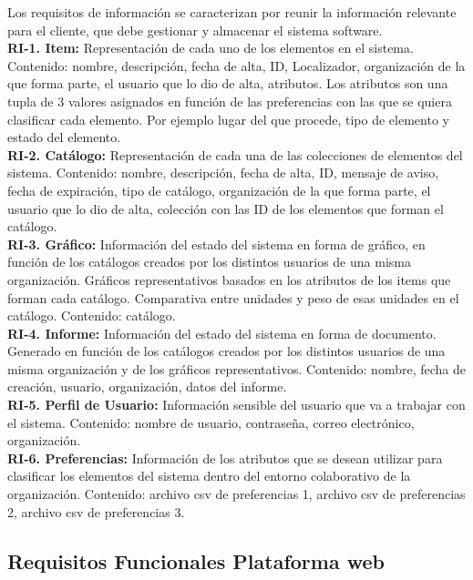 \documentclass[a4paper,11pt]{book}
\begin{document}
Los requisitos de información se caracterizan por reunir la información relevante para el cliente, que debe gestionar y almacenar el sistema software.\\

\textbf{RI-1. Item:} Representación de cada uno de los elementos en el sistema. 
Contenido: nombre, descripción, fecha de alta, ID, Localizador, organización de la que forma parte, el usuario que lo dio de alta, atributos. Los atributos son una tupla de 3 valores asignados en función de las preferencias con las que se quiera clasificar  cada elemento. Por ejemplo lugar del que procede, tipo de elemento y estado del elemento.\\


\textbf{RI-2. Catálogo:} Representación de cada una de las colecciones de elementos del sistema. Contenido: nombre, descripción, fecha de alta, ID, mensaje de aviso, fecha de expiración, tipo de catálogo,  organización de la que forma parte, el usuario que lo dio de alta, colección con las ID de los elementos que forman el catálogo.\\

\textbf{RI-3. Gráfico:} Información del estado del sistema en forma de gráfico, en función de los catálogos creados por los distintos usuarios de una misma organización. Gráficos representativos basados en los atributos de los items que forman cada catálogo. Comparativa entre unidades y peso de esas unidades en el catálogo. Contenido: catálogo.\\

\textbf{RI-4. Informe:} Información del estado del sistema en forma de documento. Generado en función de los catálogos creados por los distintos usuarios de una misma organización y de los gráficos representativos. 
Contenido: nombre, fecha de creación, usuario, organización, datos del informe. \\

\textbf{RI-5. Perfil de Usuario:} Información sensible del usuario que va a trabajar con el sistema. Contenido: nombre de usuario, contraseña, correo electrónico, organización.\\

\textbf{RI-6. Preferencias:} Información de los atributos que se desean utilizar para clasificar los elementos del sistema dentro del entorno colaborativo de la organización.
Contenido: archivo csv de preferencias 1, archivo csv de preferencias 2, archivo csv de preferencias 3.\\


\subsection{Requisitos Funcionales Plataforma web}
\end{document}
